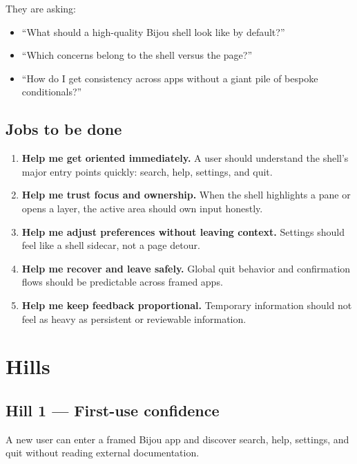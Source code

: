 They are asking:

\begin{itemize}
\tightlist
\item
  ``What should a high-quality Bijou shell look like by default?''
\item
  ``Which concerns belong to the shell versus the page?''
\item
  ``How do I get consistency across apps without a giant pile of bespoke conditionals?''
\end{itemize}

\subsection{Jobs to be done}\label{record-047-jobs-to-be-done}

\begin{enumerate}
\def\labelenumi{\arabic{enumi}.}
\item
  \textbf{Help me get oriented immediately.} A user should understand the shell's major entry points quickly: search, help, settings, and quit.
\item
  \textbf{Help me trust focus and ownership.} When the shell highlights a pane or opens a layer, the active area should own input honestly.
\item
  \textbf{Help me adjust preferences without leaving context.} Settings should feel like a shell sidecar, not a page detour.
\item
  \textbf{Help me recover and leave safely.} Global quit behavior and confirmation flows should be predictable across framed apps.
\item
  \textbf{Help me keep feedback proportional.} Temporary information should not feel as heavy as persistent or reviewable information.
\end{enumerate}

\section{Hills}\label{record-047-hills}

\subsection{Hill 1 --- First-use confidence}\label{record-047-hill-1-first-use-confidence}

A new user can enter a framed Bijou app and discover search, help, settings, and quit without reading external documentation.

